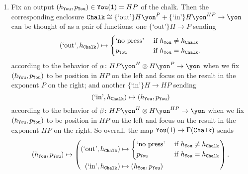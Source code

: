 \documentclass[Book-Poly]{subfiles}
\begin{document}
\begin{exercise}
\begin{solution}
\begin{enumerate}
    \item Fix an output $(h_{\texttt{You}},p_{\texttt{You}})\in\texttt{You}(\textsf{1})=HP$ of the chalk.
    Then the corresponding enclosure $\const{Chalk}\iso\{\text{`out'}\}H\yon^P + \{\text{`in'}\}H\yon^{HP}\to\yon$ can be thought of as a pair of functions: one $\{\text{`out'}\}H\to P$ sending
    \[
        (\text{`out'},h_{\texttt{Chalk}})\mapsto
            \begin{cases}
  	            \text{`no press'} & \textnormal{ if } h_{\texttt{You}} \neq h_{\texttt{Chalk}} \\
  	            p_{\texttt{You}} & \textnormal{ if } h_{\texttt{You}} = h_{\texttt{Chalk}}.
            \end{cases}
    \]
    according to the behavior of $\alpha\colon HP\yon^H\otimes H\yon^P\to\yon$ when we fix $(h_{\texttt{You}},p_{\texttt{You}})$ to be position in $HP$ on the left and focus on the result in the exponent $P$ on the right; and another $\{\text{`in'}\}H\to HP$ sending
    \[
        (\text{`in'},h_{\texttt{Chalk}})\mapsto(h_{\texttt{You}},p_{\texttt{You}})
    \]
    according to the behavior of $\beta\colon HP\yon^H\otimes H\yon^{HP}\to\yon$ when we fix $(h_{\texttt{You}},p_{\texttt{You}})$ to be position in $HP$ on the left and focus on the result in the exponent $HP$ on the right.
    So overall, the map $\texttt{You}(\textsf{1})\to\Gamma(\texttt{Chalk})$ sends
    \[
        (h_{\texttt{You}},p_{\texttt{You}})\mapsto\left(
            \begin{aligned}
                (\text{`out'},h_{\texttt{Chalk}})&\mapsto
                    \begin{cases}
          	            \text{`no press'} & \textnormal{ if } h_{\texttt{You}} \neq h_{\texttt{Chalk}} \\
          	            p_{\texttt{You}} & \textnormal{ if } h_{\texttt{You}} = h_{\texttt{Chalk}}
                    \end{cases} \\
                (\text{`in'},h_{\texttt{Chalk}})&\mapsto(h_{\texttt{You}},p_{\texttt{You}})
            \end{aligned}
        \right).
    \]
\end{enumerate}
\end{solution}
\end{exercise}
\end{document}
